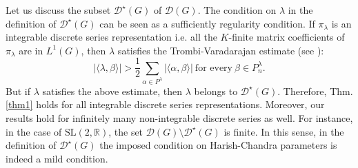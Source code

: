 \documentclass[11 pt]{amsart}
\newcommand{\R}{{\mathbb R}}
\newtheorem{defn}[subsubsection]{{\bf Definition}}
\theoremstyle{definition}
\numberwithin{equation}{section}
\begin{document}



Let us discuss the subset $\mathcal{D}^{\star}(G)$ of $\mathcal{D}(G)$. The condition on $\lambda$ in the definition of $\mathcal{D^\star}(G)$ can be seen as a sufficiently regularity condition. If $\pi_{\lambda}$ is an integrable discrete series representation i.e. all the $K$-finite matrix coefficients of $\pi_{\lambda}$ are in $L^1(G)$, then $\lambda$ satisfies the Trombi-Varadarajan estimate (see \cite{TV}): 
$$ | \langle \lambda , \beta \rangle | > \frac{1}{2} \sum\limits_{\alpha \in P^{\lambda}} | \langle \alpha , \beta \rangle|\ \text{for every}\ \beta \in P_n^{\lambda}.$$
But if $\lambda$ satisfies the above estimate, then $\lambda$ belongs to $\mathcal{D}^{\star}(G)$. Therefore, Thm. \ref{thm1} holds for all integrable discrete series representations. Moreover, our results hold for infinitely many non-integrable discrete series as well. For instance, in the case of $\mathrm{SL}(2, \R)$, the set $\mathcal{D}(G) \setminus \mathcal{D}^{\star}(G)$ is finite. In this sense, in the definition of $\mathcal{D}^{\star}(G)$ the imposed condition on Harish-Chandra parameters is indeed a mild condition.

\vspace{5pt}
\end{document}
